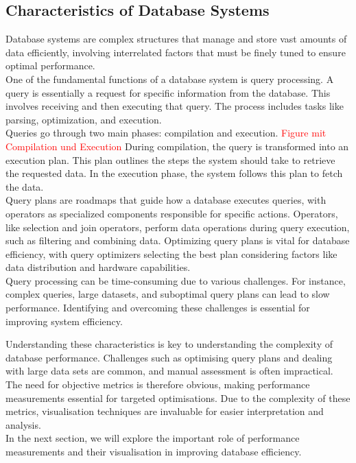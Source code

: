 \subsection{Characteristics of Database Systems}
Database systems are complex structures that manage and store vast amounts of data efficiently, involving interrelated factors that must be finely tuned to ensure optimal performance.\\
One of the fundamental functions of a database system is query processing. A query is essentially a request for specific information from the database. This involves receiving and then executing that query. The process includes tasks like parsing, optimization, and execution.\\
Queries go through two main phases: compilation and execution. \textcolor{red}{Figure mit Compilation und Execution} During compilation, the query is transformed into an execution plan. This plan outlines the steps the system should take to retrieve the requested data. In the execution phase, the system follows this plan to fetch the data.\\
Query plans are roadmaps that guide how a database executes queries, with operators as specialized components responsible for specific actions. Operators, like selection and join operators, perform data operations during query execution, such as filtering and combining data. Optimizing query plans is vital for database efficiency, with query optimizers selecting the best plan considering factors like data distribution and hardware capabilities.\\
Query processing can be time-consuming due to various challenges. For instance, complex queries, large datasets, and suboptimal query plans can lead to slow performance. Identifying and overcoming these challenges is essential for improving system efficiency.

Understanding these characteristics is key to understanding the complexity of database performance. Challenges such as optimising query plans and dealing with large data sets are common, and manual assessment is often impractical.\\
The need for objective metrics is therefore obvious, making performance measurements essential for targeted optimisations. Due to the complexity of these metrics, visualisation techniques are invaluable for easier interpretation and analysis.\\
In the next section, we will explore the important role of performance measurements and their visualisation in improving database efficiency.


